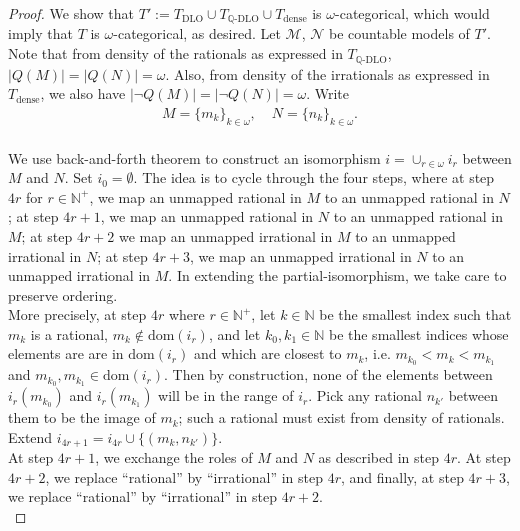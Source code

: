 \documentclass{article}
\begin{document}
\begin{enumerate}[label={\bf Q\arabic*:}]
\begin{proof}
      We show that $T':=T_\text{DLO}\cup T_{\mathbb{Q}\text{-DLO}}\cup
      T_{\text{dense}}$ is $\omega$-categorical, which would imply that $T$
      is $\omega$-categorical, as desired. Let $\mathcal{M}$, $\mathcal{N}$
      be countable models of $T'$. Note that from density of the rationals
      as expressed in $T_{\mathbb{Q}\text{-DLO}}$,
      $|Q(M)|=|Q(N)|=\omega$. Also, from density of the irrationals as
      expressed in $T_{\text{dense}}$, we also have $|\neg Q(M)|=|\neg
      Q(N)|=\omega$. Write
      \[\begin{array}{ll}
        M=\{m_k\}_{k\in\omega},\; &N=\{n_k\}_{k\in\omega}.
        \\
      \end{array}\]

      We use back-and-forth theorem to construct an isomorphism
      $i=\cup_{r\in\omega}i_r$ between $M$ and $N$. Set $i_0=\emptyset$.
      The idea is to cycle through the four steps, where at step $4r$ for
      $r\in\mathbb{N}^+$, we map an unmapped rational in $M$ to an unmapped
      rational in $N$; at step $4r+1$, we map an unmapped rational in $N$
      to an unmapped rational in $M$; at step $4r+2$ we map an unmapped
      irrational in $M$ to an unmapped irrational in $N$; at step $4r+3$,
      we map an unmapped irrational in $N$ to an unmapped irrational in
      $M$. In extending the partial-isomorphism, we take care to preserve
      ordering. \\

      More precisely, at step $4r$ where $r\in\mathbb{N}^+$, let
      $k\in\mathbb{N}$ be the smallest index such that $m_k$ is a rational,
      $m_k\not\in\text{dom}(i_r)$, and let $k_0,k_1\in\mathbb{N}$ be the
      smallest indices whose elements are are in $\text{dom}(i_r)$ and
      which are closest to $m_k$, i.e. $m_{k_0}<m_k<m_{k_1}$ and
      $m_{k_0},m_{k_1}\in\text{dom}(i_r)$. Then by construction, none of
      the elements between $i_r(m_{k_0})$ and $i_r(m_{k_1})$ will be in the
      range of $i_r$. Pick any rational $n_{k'}$ between them to be the
      image of $m_k$; such a rational must exist from density of rationals.
      Extend $i_{4r+1}=i_{4r}\cup\{(m_k,n_{k'})\}$. \\

      At step $4r+1$, we exchange the roles of $M$ and $N$ as described in
      step $4r$. At step $4r+2$, we replace ``rational'' by ``irrational''
      in step $4r$, and finally, at step $4r+3$, we replace ``rational'' by
      ``irrational'' in step $4r+2$. \\


\end{proof}
\end{enumerate}
\end{document}
